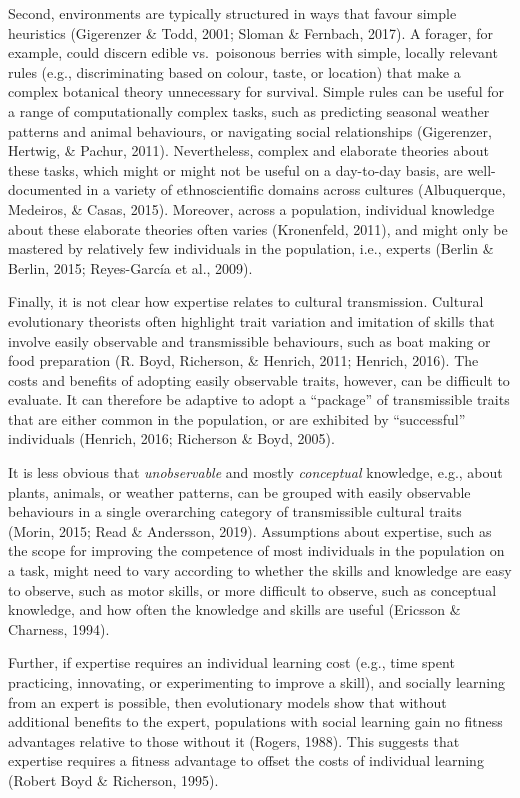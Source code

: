 \documentclass[
  11pt,
]{article}
\begin{document}
Second, environments are typically structured in ways that favour simple heuristics (Gigerenzer \& Todd, 2001; Sloman \& Fernbach, 2017). A forager, for example, could discern edible vs.~poisonous berries with simple, locally relevant rules (e.g., discriminating based on colour, taste, or location) that make a complex botanical theory unnecessary for survival. Simple rules can be useful for a range of computationally complex tasks, such as predicting seasonal weather patterns and animal behaviours, or navigating social relationships (Gigerenzer, Hertwig, \& Pachur, 2011). Nevertheless, complex and elaborate theories about these tasks, which might or might not be useful on a day-to-day basis, are well-documented in a variety of ethnoscientific domains across cultures (Albuquerque, Medeiros, \& Casas, 2015). Moreover, across a population, individual knowledge about these elaborate theories often varies (Kronenfeld, 2011), and might only be mastered by relatively few individuals in the population, i.e., experts (Berlin \& Berlin, 2015; Reyes-García et al., 2009).

Finally, it is not clear how expertise relates to cultural transmission. Cultural evolutionary theorists often highlight trait variation and imitation of skills that involve easily observable and transmissible behaviours, such as boat making or food preparation (R. Boyd, Richerson, \& Henrich, 2011; Henrich, 2016). The costs and benefits of adopting easily observable traits, however, can be difficult to evaluate. It can therefore be adaptive to adopt a ``package'' of transmissible traits that are either common in the population, or are exhibited by ``successful'' individuals (Henrich, 2016; Richerson \& Boyd, 2005).

It is less obvious that \emph{unobservable} and mostly \emph{conceptual} knowledge, e.g., about plants, animals, or weather patterns, can be grouped with easily observable behaviours in a single overarching category of transmissible cultural traits (Morin, 2015; Read \& Andersson, 2019). Assumptions about expertise, such as the scope for improving the competence of most individuals in the population on a task, might need to vary according to whether the skills and knowledge are easy to observe, such as motor skills, or more difficult to observe, such as conceptual knowledge, and how often the knowledge and skills are useful (Ericsson \& Charness, 1994).

Further, if expertise requires an individual learning cost (e.g., time spent practicing, innovating, or experimenting to improve a skill), and socially learning from an expert is possible, then evolutionary models show that without additional benefits to the expert, populations with social learning gain no fitness advantages relative to those without it (Rogers, 1988). This suggests that expertise requires a fitness advantage to offset the costs of individual learning (Robert Boyd \& Richerson, 1995).
\end{document}
